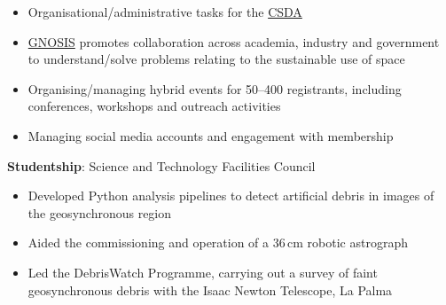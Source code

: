 \documentclass[10pt,a4paper]{altacv}
\begin{document}
\divider


\begin{itemize}
	\item Organisational/administrative tasks for the \href{https://warwick.ac.uk/fac/sci/physics/research/astro/csda/}{CSDA}
\end{itemize}

\divider


\begin{itemize}
	\item \href{https://gnosisnetwork.org/}{GNOSIS} promotes collaboration across academia, industry and government to understand/solve problems relating to the sustainable use of space
	\item Organising/managing hybrid events for 50--400 registrants, including conferences, workshops and outreach activities
	\item Managing social media accounts and engagement with membership
\end{itemize}

\divider


\small \textbf{Studentship}: Science and Technology Facilities Council 

\smallskip

\begin{itemize}
	\item Developed Python analysis pipelines to detect artificial debris in images of the geosynchronous region
	\item Aided the commissioning and operation of a 36\,cm robotic astrograph
	\item Led the DebrisWatch Programme, carrying out a survey of faint geosynchronous debris with the Isaac Newton Telescope, La Palma
\end{itemize}

\divider
\end{document}
